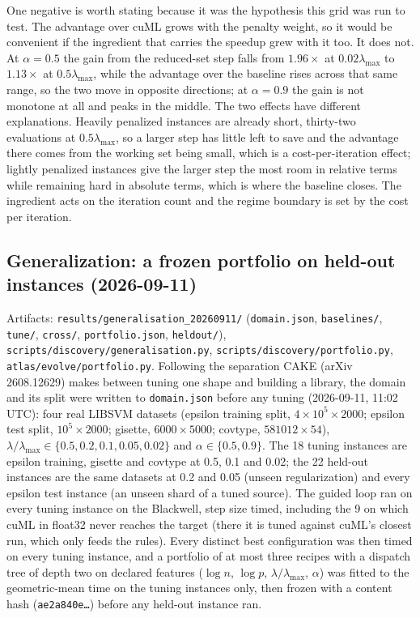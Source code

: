 One negative is worth stating because it was the hypothesis this grid was run
to test. The advantage over cuML grows with the penalty weight, so it would be
convenient if the ingredient that carries the speedup grew with it too. It does
not. At $\alpha = 0.5$ the gain from the reduced-set step falls from
$1.96\times$ at $0.02\lambda_{\max}$ to $1.13\times$ at $0.5\lambda_{\max}$,
while the advantage over the baseline rises across that same range, so the two
move in opposite directions; at $\alpha = 0.9$ the gain is not monotone at all
and peaks in the middle. The two effects have different explanations. Heavily
penalized instances are already short, thirty-two evaluations at
$0.5\lambda_{\max}$, so a larger step has little left to save and the advantage
there comes from the working set being small, which is a cost-per-iteration
effect; lightly penalized instances give the larger step the most room in
relative terms while remaining hard in absolute terms, which is where the
baseline closes. The ingredient acts on the iteration count and the regime
boundary is set by the cost per iteration.

\subsection{Generalization: a frozen portfolio on held-out instances (2026-09-11)}
\label{app:log:general}

Artifacts: \texttt{results/generalisation\_20260911/} (\texttt{domain.json},
\texttt{baselines/}, \texttt{tune/}, \texttt{cross/}, \texttt{portfolio.json},
\texttt{heldout/}), \texttt{scripts/discovery/generalisation.py},
\texttt{scripts/discovery/portfolio.py}, \texttt{atlas/evolve/portfolio.py}. Following
the separation CAKE (arXiv 2608.12629) makes between tuning one shape and building a
library, the domain and its split were written to \texttt{domain.json} before any
tuning (2026-09-11, 11:02 UTC): four real LIBSVM datasets (epsilon training split,
$4\times10^5\times2000$; epsilon test split, $10^5\times2000$; gisette, $6000\times5000$;
covtype, $581012\times54$), $\lambda/\lambda_{\max}\in\{0.5, 0.2, 0.1, 0.05, 0.02\}$ and
$\alpha\in\{0.5, 0.9\}$. The 18 tuning instances are epsilon training, gisette and
covtype at 0.5, 0.1 and 0.02; the 22 held-out instances are the same datasets at 0.2
and 0.05 (unseen regularization) and every epsilon test instance (an unseen shard of a
tuned source). The guided loop ran on every tuning instance on the Blackwell, step
size timed, including the 9 on which cuML in float32 never reaches the target (there
it is tuned against cuML's closest run, which only feeds the rules). Every distinct
best configuration was then timed on every tuning instance, and a portfolio of at most
three recipes with a dispatch tree of depth two on declared features ($\log n$,
$\log p$, $\lambda/\lambda_{\max}$, $\alpha$) was fitted to the geometric-mean time on the
tuning instances only, then frozen with a content hash (\texttt{ae2a840e\ldots}) before
any held-out instance ran.


